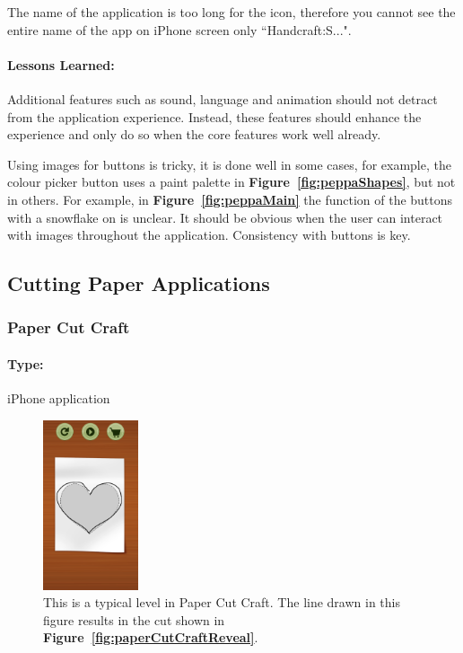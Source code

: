 \documentclass[11pt]{article}
\begin{document}
                The name of the application is too long for the icon, therefore you cannot see the entire name of the app on iPhone screen only ``Handcraft:S...".
                
                \paragraph{Lessons Learned:}   
                Additional features such as sound, language and animation should not detract from the application experience. Instead, these features should enhance the experience and only do so when the core features work well already. 
                
                Using images for buttons is tricky, it is done well in some cases, for example, the colour picker button uses a paint palette in \textbf{Figure~\ref{fig:peppaShapes}}, but not in others. For example, in \textbf{Figure~\ref{fig:peppaMain}} the function of the buttons with a snowflake on is unclear. It should be obvious when the user can interact with images throughout the application. Consistency with buttons is key.
                
        \subsection{Cutting Paper Applications}
            \subsubsection{Paper Cut Craft}
            
                \paragraph{Type:} iPhone application \cite{PaperCutCraft}
                 
                 \begin{figure}
                    \includegraphics[width=0.25\textwidth]{Images/paperCutCraftCut}
                    \caption{This is a typical level in Paper Cut Craft. The line drawn in this figure results in the cut shown in \textbf{Figure~\ref{fig:paperCutCraftReveal}}.}
                    \label{fig:paperCutCraftCut}
                \end{figure}
                
\end{document}
